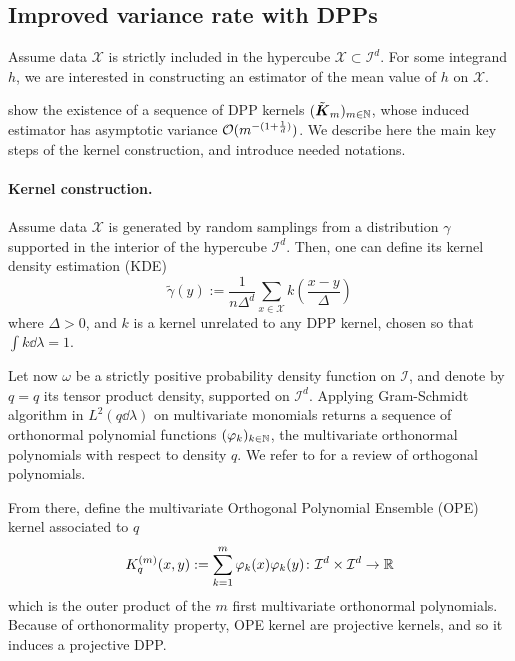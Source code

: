 \subsection{Improved variance rate with DPPs}

Assume data $\mathcal{X}$ is strictly included in the hypercube $\mathcal{X} \subset \mathcal{I}^d$. For some integrand $h$, we are interested in constructing an estimator of the mean value of $h$ on $\mathcal{X}$.

\cite{bardenet2021sgddpp} show the existence of a sequence of DPP kernels $(\tilde{\boldsymbol K}_{m})_{m\in\mathbb{N}}$, whose induced estimator has asymptotic variance $\mathcal{O}( m ^{-(1+\frac 1 d)})$. We describe here the main key steps of the kernel construction, and introduce needed notations.

\paragraph{Kernel construction.}
Assume data $\mathcal{X}$ is generated by random samplings from a distribution $\gamma$ supported in the interior of the hypercube $\mathcal{I}^d$. Then, one can define its kernel density estimation (KDE)
\begin{equation*}
	\tilde \gamma(y) := \frac{1}{n\Delta^d} \sum_{x\in \mathcal{X}} k\left(\frac{x-y}{\Delta}\right)
\end{equation*}
where $\Delta >0$, and $k$ is a kernel unrelated to any DPP kernel, chosen so that $\int k \dd \lambda = 1$. 

Let now $\omega$ be a strictly positive probability density function on $\mathcal{I}$, and  denote by $q = q$ its tensor product density, supported on $\mathcal{I}^d$. Applying Gram-Schmidt algorithm in $L^2(q \dd \lambda)$ on multivariate monomials returns a sequence of orthonormal polynomial functions $(\varphi_k)_{k\in \mathbb{N}}$, the multivariate orthonormal polynomials with respect to density $q$. We refer to \cite{gautschi2004ope} for a review of orthogonal polynomials.

From there, define the multivariate Orthogonal Polynomial Ensemble (OPE) kernel associated to $q$
\begin{equation}
	K_q^{(m)}(x,y) := \sum_{k=1}^m \varphi_k(x) \varphi_k(y) \colon \mathcal{I}^d \times \mathcal{I}^d \to \mathbb{R}
\end{equation}
which is the outer product of the $m$ first multivariate orthonormal polynomials. Because of orthonormality property, OPE kernel are projective kernels, and so it induces a projective DPP.

